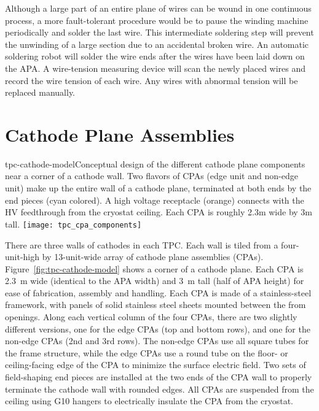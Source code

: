 Although a large part of an entire plane of wires can be wound in one continuous process, a more fault-tolerant procedure would be to pause the winding machine periodically and solder the last wire. This intermediate soldering step will prevent the unwinding of a large section due to an accidental broken wire.  An automatic soldering robot will solder the wire ends after the wires have been laid down on the APA. A wire-tension measuring device will scan the newly placed wires and record the wire tension of each wire. Any wires with abnormal tension will be replaced manually.



\section{Cathode Plane Assemblies}
\label{subsec:v5-tpc-chamber-cathode}


\begin{cdrfigure}{tpc-cathode-model}{Conceptual design of the different cathode plane components near a corner of a cathode wall.  Two flavors of CPAs (edge unit and non-edge unit) make up the entire wall of a cathode plane, terminated at both ends by the end pieces (cyan colored).  A high voltage receptacle (orange) connects with the HV feedthrough from the cryostat ceiling. Each CPA is roughly 2.3m wide by 3m tall.}
\texttt{[image: tpc\_cpa\_components]}
\end{cdrfigure}



There are three walls of cathodes in each TPC.  Each wall is tiled from a four-unit-high by 13-unit-wide array of cathode plane assemblies (CPAs). Figure~\ref{fig:tpc-cathode-model} shows a corner of a cathode plane.  Each CPA is 2.3~m wide (identical to the APA width) and 3~m tall (half of APA height) for ease of fabrication, assembly and handling.  Each CPA is made of a stainless-steel framework, 
with panels of solid stainless steel sheets mounted between the from openings.  Along each vertical  column of the four CPAs, there are two slightly different versions, one for the edge CPAs (top and bottom rows), and one for the non-edge CPAs (2nd and 3rd rows).  The non-edge CPAs use all square tubes for the frame structure, while the edge CPAs use a round tube on the %
floor- or ceiling-facing edge of the CPA %
to minimize the surface electric field.  Two sets of field-shaping end pieces are installed at the two ends of the CPA wall to properly terminate the cathode wall with rounded edges.  All CPAs are suspended from the ceiling using G10 hangers to electrically insulate the CPA from the cryostat.

